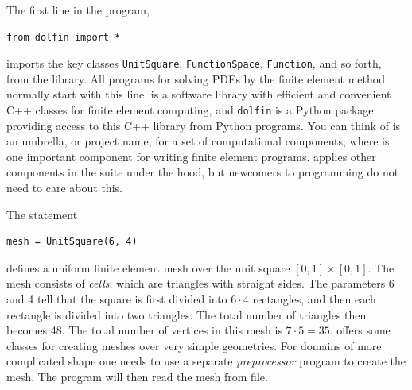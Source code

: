 The first line in the program,
\begin{Verbatim}[fontsize=\fontsize{10pt}{10pt},tabsize=8,baselinestretch=1.05,
fontfamily=tt,xleftmargin=7mm]
from dolfin import *
\end{Verbatim}
\noindent
imports the key classes {\fontsize{12pt}{12pt}\verb!UnitSquare!},
{\fontsize{12pt}{12pt}\verb!FunctionSpace!}, {\fontsize{12pt}{12pt}\verb!Function!}, and so forth, from the \dolfin{} library.
All \fenics{} programs for solving PDEs by the finite element method
normally start with this line. \dolfin{} is a software library with efficient
and convenient C++ classes for finite element computing, and
{\fontsize{12pt}{12pt}\texttt{dolfin}} is a Python package providing access to this
C++ library from Python programs.
You can think of \fenics{} is an umbrella, or project name, for a set of
computational components, where \dolfin{} is one important component for
writing finite element programs. \dolfin{} applies other components
in the \fenics{} suite under the hood, but newcomers to \fenics{}
programming do not need to care about this.

The statement
\begin{Verbatim}[fontsize=\fontsize{10pt}{10pt},tabsize=8,baselinestretch=1.05,
fontfamily=tt,xleftmargin=7mm]
mesh = UnitSquare(6, 4)
\end{Verbatim}
\noindent
defines a uniform finite element mesh over the unit square
$[0,1]\times [0,1]$. The mesh consists of \emph{cells},
which are triangles with
straight sides. The parameters 6 and 4 tell that the square is
first divided into $6\cdot 4$ rectangles, and then each rectangle
is divided into two triangles. The total number of triangles
then becomes 48. The total number of vertices in this mesh is
$7\cdot 5=35$.
\dolfin{} offers some classes for creating meshes over
very simple geometries. For domains of more complicated shape one needs
to use a separate \emph{preprocessor} program to create the mesh.
The \fenics{} program will then read the mesh from file.


